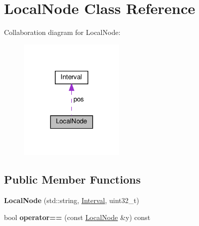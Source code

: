 \hypertarget{classLocalNode}{}\section{Local\+Node Class Reference}
\label{classLocalNode}


Collaboration diagram for Local\+Node\+:\nopagebreak
\begin{figure}[H]
\begin{center}
\leavevmode
\includegraphics[width=143pt]{classLocalNode__coll__graph}
\end{center}
\end{figure}
\subsection*{Public Member Functions}
\begin{DoxyCompactItemize}
\item 
\mbox{\label{classLocalNode_a2802a95378b038d09ba861467621d9d6}} 
{\bfseries Local\+Node} (std\+::string, \hyperlink{structInterval}{Interval}, uint32\+\_\+t)
\item 
\mbox{\label{classLocalNode_a363824a550915c6a5874489571a6efe3}} 
bool {\bfseries operator==} (const \hyperlink{classLocalNode}{Local\+Node} \&y) const
\end{DoxyCompactItemize}
